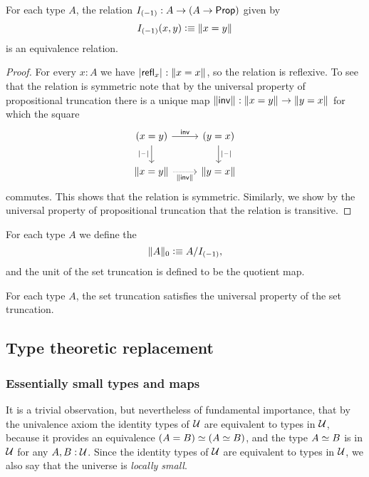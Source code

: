 \begin{lem}
For each type $A$, the relation $I_{(-1)}:A\to (A\to\prop)$ given by
\begin{equation*}
I_{(-1)}(x,y)\defeq\brck{x=y}
\end{equation*}
is an equivalence relation.
\end{lem}

\begin{proof}
For every $x:A$ we have $\bproj{\refl{x}}:\brck{x=x}$, so the relation is reflexive. To see that the relation is symmetric note that by the universal property of propositional truncation there is a unique map $\brck{\invfunc}:\brck{x=y}\to\brck{y=x}$ for which the square
\begin{equation*}
\begin{tikzcd}
(x=y) \arrow[r,"\invfunc"] \arrow[d,swap,"\bproj{\blank}"] & (y=x) \arrow[d,"\bproj{\blank}"] \\
\brck{x=y} \arrow[r,densely dotted,swap,"\brck{\invfunc}"] & \brck{y=x}
\end{tikzcd}
\end{equation*}
commutes. This shows that the relation is symmetric. Similarly, we show by the universal property of propositional truncation that the relation is transitive.
\end{proof}

\begin{defn}
For each type $A$ we define the 
\begin{equation*}
\trunc{0}{A}\defeq A/I_{(-1)},
\end{equation*}
and the unit of the set truncation is defined to be the quotient map.
\end{defn}

\begin{thm}
For each type $A$, the set truncation satisfies the universal property of the set truncation.
\end{thm}

\subsection{Type theoretic replacement}
\subsubsection{Essentially small types and maps}
It is a trivial observation, but nevertheless of fundamental importance, that by the univalence axiom the identity types of $\UU$ are equivalent to types in $\UU$, because it provides an equivalence $\eqv{(A=B)}{(\eqv{A}{B})}$, and the type $\eqv{A}{B}$ is in $\UU$ for any $A,B:\UU$. Since the identity types of $\UU$ are equivalent to types in $\UU$, we also say that the universe is \emph{locally small}.

